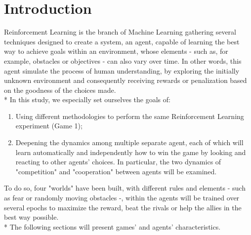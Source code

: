 \section{Introduction}
Reinforcement Learning is the branch of Machine Learning gathering several techniques designed to create a system, an agent, capable of learning the best way to achieve goals within an environment, whose elements - such as, for example, obstacles or objectives - can also vary over time. In other words, this agent simulate the process of human understanding, by exploring the initially unknown environment and consequently receiving rewards or penalization based on the goodness of the choices made.\\*
In this study, we especially set ourselves the goals of:
\begin{enumerate}
  \item Using different methodologies to perform the same Reinforcement Learning experiment (Game 1);
  \item Deepening the dynamics among multiple separate agent, each of which will learn automatically and independently how to win the game by looking and reacting to other agents' choices. In particular, the two dynamics of "competition" and "cooperation" between agents will be examined.
\end{enumerate}
To do so, four "worlds" have been built, with different rules and elements - such as fear or randomly moving obstacles -, within the agents will be trained over several epochs to maximize the reward, beat the rivals or help the allies in the best way possible.\\*
The following sections will present games' and agents' characteristics. 
\newpage

